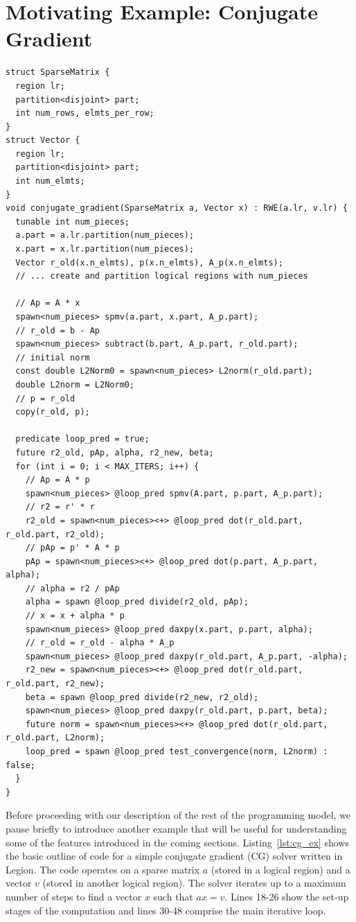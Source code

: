 \section{Motivating Example: Conjugate Gradient}
\label{sec:cgex}

\begin{lstlisting}[float,floatplacement=H,label={lst:cg_ex},caption={Conjugate Gradient Example}]
struct SparseMatrix {
  region lr;
  partition<disjoint> part; 
  int num_rows, elmts_per_row;
}
struct Vector {
  region lr;
  partition<disjoint> part;
  int num_elmts;
}
void conjugate_gradient(SparseMatrix a, Vector x) : RWE(a.lr, v.lr) {
  tunable int num_pieces;
  a.part = a.lr.partition(num_pieces);
  x.part = x.lr.partition(num_pieces);
  Vector r_old(x.n_elmts), p(x.n_elmts), A_p(x.n_elmts);
  // ... create and partition logical regions with num_pieces

  // Ap = A * x
  spawn<num_pieces> spmv(a.part, x.part, A_p.part);
  // r_old = b - Ap
  spawn<num_pieces> subtract(b.part, A_p.part, r_old.part);
  // initial norm
  const double L2Norm0 = spawn<num_pieces> L2norm(r_old.part);
  double L2norm = L2Norm0;
  // p = r_old
  copy(r_old, p);

  predicate loop_pred = true;
  future r2_old, pAp, alpha, r2_new, beta;
  for (int i = 0; i < MAX_ITERS; i++) {
    // Ap = A * p
    spawn<num_pieces> @loop_pred spmv(A.part, p.part, A_p.part);
    // r2 = r' * r
    r2_old = spawn<num_pieces><+> @loop_pred dot(r_old.part, r_old.part, r2_old);
    // pAp = p' * A * p
    pAp = spawn<num_pieces><+> @loop_pred dot(p.part, A_p.part, alpha);
    // alpha = r2 / pAp
    alpha = spawn @loop_pred divide(r2_old, pAp);
    // x = x + alpha * p
    spawn<num_pieces> @loop_pred daxpy(x.part, p.part, alpha);
    // r_old = r_old - alpha * A_p
    spawn<num_pieces> @loop_pred daxpy(r_old.part, A_p.part, -alpha);
    r2_new = spawn<num_pieces><+> @loop_pred dot(r_old.part, r_old.part, r2_new);
    beta = spawn @loop_pred divide(r2_new, r2_old);
    spawn<num_pieces> @loop_pred daxpy(r_old.part, p.part, beta);
    future norm = spawn<num_pieces><+> @loop_pred dot(r_old.part, r_old.part, L2norm);
    loop_pred = spawn @loop_pred test_convergence(norm, L2norm) : false;
  }
}
\end{lstlisting}

Before proceeding with our description of the rest of the programming
model, we pause briefly to introduce another example that will be
useful for understanding some of the features introduced in the coming
sections. Listing~\ref{lst:cg_ex} shows the basic outline of code
for a simple conjugate gradient (CG) solver written in Legion. The code
operates on a sparse matrix $a$ (stored in a logical region) and a vector
$v$ (stored in another logical region). The solver iterates up to a
maximum number of steps to find a vector $x$ such that $ax = v$. Lines
18-26 show the set-up stages of the computation and lines 30-48 
comprise the main iterative loop.

